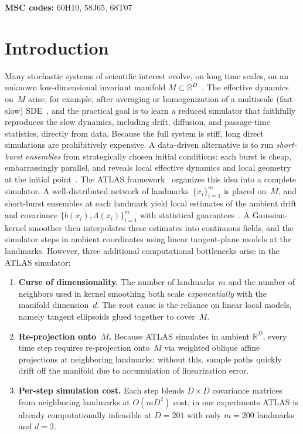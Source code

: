 \documentclass[11pt]{article}
\newcommand{\R}{\mathbb{R}}
\begin{document}
\medskip
\noindent\textbf{MSC codes:} 60H10, 58J65, 68T07




\section{Introduction}\label{sec:intro}

Many stochastic systems of scientific interest evolve, on long time
scales, on an unknown low-dimensional invariant manifold
$M\subset\R^D$~\cite{chirikjian,Hsu,PA_book08,NB_book06}.
The effective dynamics on~$M$ arise, for example, after averaging or
homogenization of a multiscale (fast--slow)
SDE~\cite{leimkuhler2015molecular,PA_book08}, and the practical goal is
to learn a reduced simulator that faithfully reproduces the slow
dynamics, including drift, diffusion, and passage-time statistics, directly from
data.
Because the full system is stiff, long direct simulations are prohibitively expensive.
A data-driven alternative is to run \emph{short-burst ensembles}
from strategically chosen initial conditions: each burst is
cheap, embarrassingly parallel, and reveals local effective dynamics
and local geometry at the initial point~\cite{Miles17,yym}.
The ATLAS framework~\cite{Miles17,yym} organizes this idea into a
complete simulator.
A well-distributed network of landmarks~$\{x_i\}_{i=1}^m$ is placed
on~$M$, and short-burst ensembles at each landmark yield local
estimates of the ambient drift and covariance
$\{b(x_i),\Lambda(x_i)\}_{i=1}^m$ with statistical
guarantees~\cite{Miles17}.
A Gaussian-kernel smoother then interpolates these estimates into
continuous fields, and the simulator steps in ambient coordinates using
linear tangent-plane models at the landmarks.
However, three additional computational bottlenecks arise in the ATLAS simulator:
\begin{enumerate}[leftmargin=*,nosep]
\item \textbf{Curse of dimensionality.}
  The number of landmarks~$m$ and the number of neighbors used in
  kernel smoothing both scale \emph{exponentially} with the manifold
  dimension~$d$.
  The root cause is the reliance on linear local models, namely tangent
  ellipsoids glued together to cover~$M$.
\item \textbf{Re-projection onto~$M$.}
  Because ATLAS simulates in ambient $\R^D$, every time step requires
  re-projection onto~$M$ via weighted oblique affine projections at
  neighboring landmarks; without this, sample paths quickly drift off
  the manifold due to accumulation of linearization error.
\item \textbf{Per-step simulation cost.}
  Each step blends $D\times D$ covariance matrices from neighboring
  landmarks at $O(m D^2)$ cost;
  in our experiments ATLAS is already computationally infeasible at
  $D{=}201$ with only $m{=}200$ landmarks and $d{=}2$.
\end{enumerate}
\end{document}
